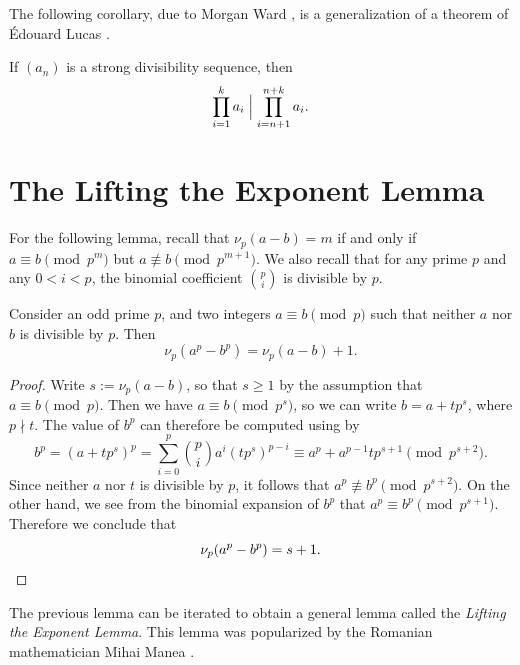 The following corollary, due to Morgan Ward \cite{ward1936}, is a generalization of a theorem of \'Edouard Lucas \cite{lucas1878}.

\begin{corollary}
  If $(a_n)$ is a strong divisibility sequence, then
  \begin{equation*}
    \prod_{i=1}^ka_i \Bigm| \prod_{i={n+1}}^{n+k}a_i.
  \end{equation*}
\end{corollary}

\section{The Lifting the Exponent Lemma}

For the following lemma, recall that $\nu_p(a-b)=m$ if and only if $a\equiv b\pmod{p^m}$ but $a\nequiv b\pmod{p^{m+1}}$. We also recall that for any prime $p$ and any $0<i<p$, the binomial coefficient $\binom{p}{i}$ is divisible by $p$. 

\begin{lemma}\label{theorem:lte-step}
  Consider an odd prime $p$, and two integers $a\equiv b\pmod{p}$ such that neither $a$ nor $b$ is divisible by $p$. Then
  \begin{equation*}
    \nu_p(a^p-b^p)=\nu_p(a-b)+1.
  \end{equation*}
\end{lemma}

\begin{proof}
  Write $s:=\nu_p(a-b)$, so that $s\geq 1$ by the assumption that $a\equiv b\pmod{p}$. Then we have $a\equiv b\pmod{p^s}$, so we can write $b=a+tp^s$, where $p\nmid t$. The value of $b^p$ can therefore be computed using  by
  \begin{equation*}
    b^p=(a+tp^s)^p=\sum_{i=0}^p\binom{p}{i}a^i(tp^s)^{p-i} \equiv a^p+a^{p-1}tp^{s+1}\pmod{p^{s+2}}.
  \end{equation*}
  Since neither $a$ nor $t$ is divisible by $p$, it follows that $a^p\nequiv b^p\pmod{p^{s+2}}$. On the other hand, we see from the binomial expansion of $b^p$ that $a^p\equiv b^p\pmod{p^{s+1}}$. Therefore we conclude that
  \begin{equation*}
    \nu_p(a^p-b^p)=s+1.\qedhere
  \end{equation*}
\end{proof}

The previous lemma can be iterated to obtain a general lemma called the \emph{Lifting the Exponent Lemma}. This lemma was popularized by the Romanian mathematician Mihai Manea \cite{manea2006}.

